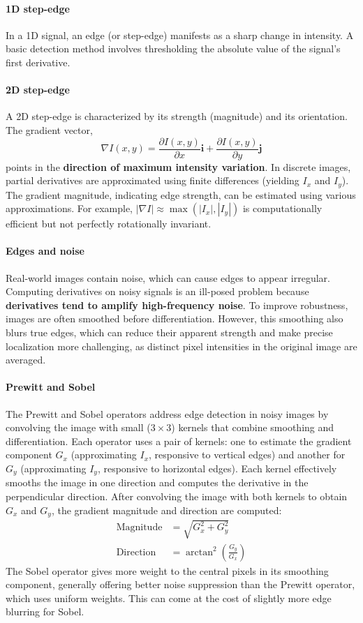 \paragraph{1D step-edge}
In a 1D signal, an edge (or step-edge) manifests as a sharp change in intensity.
A basic detection method involves thresholding the absolute value of the signal's first derivative.

\paragraph{2D step-edge}
A 2D step-edge is characterized by its strength (magnitude) and its orientation. The gradient vector,
\[ \nabla I(x,y) = \frac{\partial I(x,y)}{\partial x}\mathbf{i} + \frac{\partial I(x,y)}{\partial y}\mathbf{j} \]
points in the \textbf{direction of maximum intensity variation}. In discrete images, partial derivatives are approximated using finite differences (yielding $I_x$ and $I_y$).
The gradient magnitude, indicating edge strength, can be estimated using various approximations. For example, $|\nabla I| \approx \max(|I_x|, |I_y|)$ is computationally efficient but not perfectly rotationally invariant.

\paragraph{Edges and noise}
Real-world images contain noise, which can cause edges to appear irregular. Computing derivatives on noisy signals is an ill-posed problem because \textbf{derivatives tend to amplify high-frequency noise}.
To improve robustness, images are often smoothed before differentiation. However, this smoothing also blurs true edges, which can reduce their apparent strength and make precise localization more challenging, as distinct pixel intensities in the original image are averaged.

\paragraph{Prewitt and Sobel}
The Prewitt and Sobel operators address edge detection in noisy images by convolving the image with small ($3 \times 3$) kernels that combine smoothing and differentiation.
Each operator uses a pair of kernels: one to estimate the gradient component $G_x$ (approximating $I_x$, responsive to vertical edges) and another for $G_y$ (approximating $I_y$, responsive to horizontal edges). Each kernel effectively smooths the image in one direction and computes the derivative in the perpendicular direction.
After convolving the image with both kernels to obtain $G_x$ and $G_y$, the gradient magnitude and direction are computed:
\begin{align*}
\text{Magnitude} &= \sqrt{G_x^2 + G_y^2} \\
\text{Direction} &= \arctan^2(\frac{G_y}{G_x})
\end{align*}
The Sobel operator gives more weight to the central pixels in its smoothing component, generally offering better noise suppression than the Prewitt operator, which uses uniform weights. This can come at the cost of slightly more edge blurring for Sobel.

